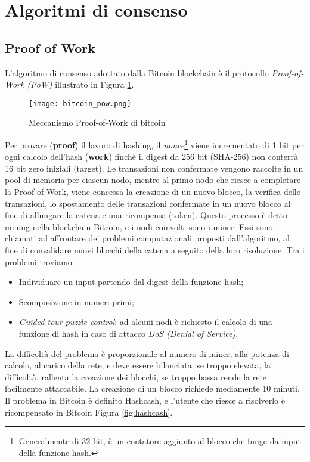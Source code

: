 \section{Algoritmi di consenso}
\subsection{Proof of Work}
L'algoritmo di consenso adottato dalla Bitcoin blockchain è il protocollo \textit{Proof-of-Work (PoW)} illustrato in Figura \ref{fig:bitcoin_pow}.

\begin{figure}[htbp]
  \centering
  \texttt{[image: bitcoin\_pow.png]}
  \caption{Meccanismo Proof-of-Work di bitcoin}
  \label{fig:bitcoin_pow}
\end{figure}

Per provare (\textbf{proof}) il lavoro di hashing, il \textit{nonce}\footnote{Generalmente di 32 bit, è un contatore aggiunto al blocco che funge da input della funzione hash.} viene incrementato di 1 bit per ogni calcolo dell'hash (\textbf{work}) finchè il digest da 256 bit (SHA-256) non conterrà 16 bit zero iniziali (target).
Le transazioni non confermate vengono raccolte in un pool di memoria per ciascun nodo, mentre al primo nodo che riesce a completare la Proof-of-Work, viene concessa la creazione di un nuovo blocco, la verifica delle transazioni, lo spostamento delle transazioni confermate in un nuovo blocco al fine di allungare la catena e una ricompensa (token). Questo processo è detto mining nella blockchain Bitcoin, e i nodi coinvolti sono i miner. Essi sono chiamati ad affrontare dei problemi computazionali proposti dall'algoritmo, al fine di convalidare nuovi blocchi della catena a seguito della loro risoluzione. Tra i problemi troviamo:

\begin{itemize}
  \item Individuare un input partendo dal digest della funzione hash;
  \item Scomposizione in numeri primi;
  \item \textit{Guided tour puzzle control}: ad alcuni nodi è richiesto il calcolo di una funzione di hash in caso di attacco \textit{DoS (Denial of Service)}.
\end{itemize}

La difficoltà del problema è proporzionale al numero di miner, alla potenza di calcolo, al carico della rete; e deve essere bilanciata: se troppo elevata, la difficoltà, rallenta la creazione dei blocchi, se troppo bassa rende la rete facilmente attaccabile. La creazione di un blocco richiede mediamente 10 minuti. Il problema in Bitcoin è definito Hashcash, e l'utente che riesce a risolverlo è ricompensato in Bitcoin Figura \ref{fig:hashcash}.

